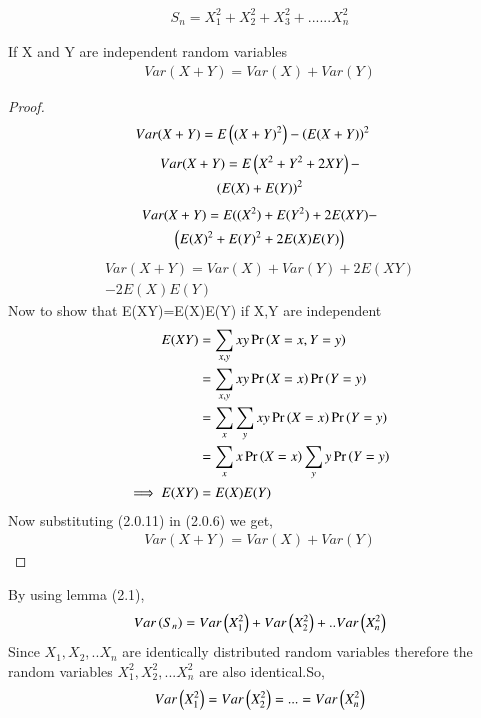 \documentclass[journal,12pt,twocolumn]{IEEEtran}
\begin{document}
\begin{align}
    S_{n}=X_{1}^2+X_{2}^2+X_{3}^2+......X_{n}^2
\end{align}
 \begin{lemma}
 If X and Y are independent random variables
 \begin{align}
     Var(X+Y)=Var(X)+Var(Y)
 \end{align}
 \end{lemma}
 \begin{proof}
 \begin{align}
    Var(X+Y)&=E\left((X+Y)^{2}\right)-\left(E(X+Y)\right)^{2}
 \end{align}
 \begin{multline}
Var(X+Y)=E\left(X^{2}+Y^{2}+2XY\right)-\\
 \left(E(X)+E(Y)\right)^{2}
\end{multline}
\begin{multline}
Var(X+Y)=E((X^{2})+E(Y^{2})+2E(XY)-\\
        \left(E(X)^{2}+E(Y)^{2}+2E(X)E(Y)\right)
\end{multline}      
\begin{multline}
    Var(X+Y)=Var(X)+Var(Y)+2E(XY)\\
    -2E(X)E(Y)
\end{multline}
 Now to show that E(XY)=E(X)E(Y) if X,Y are independent
 \begin{align}
     E(XY)&=\sum_{x,y}xy\Pr\left(X=x,Y=y\right)
     \\ &=\sum_{x,y}xy\Pr\left(X=x\right)\Pr\left(Y=y\right)
     \\ &=\sum_{x}\sum_{y}xy\Pr\left(X=x\right)\Pr\left(Y=y\right)
     \\ &=\sum_{x}x\Pr\left(X=x\right)\sum_{y}y\Pr\left(Y=y\right)
     \\\implies E(XY) &=E(X)E(Y)
 \end{align}
 Now substituting (2.0.11) in (2.0.6) we get,
 \begin{align}
     Var(X+Y)=Var(X)+Var(Y)
 \end{align}
 \end{proof}
By using lemma (2.1),
\begin{align}
    Var\left(S_{n}\right)=Var\left(X_{1}^2\right)+Var\left(X_{2}^2\right)+..Var\left(X_{n}^2\right)
\end{align}
Since $X_{1},X_{2},..X_{n}$ are identically distributed random variables therefore the random variables $X_{1}^2,X_{2}^2,...X_{n}^2$ are also identical.So,
\begin{align}
    Var\left(X_{1}^2\right)=Var\left(X_{2}^2\right)=...=Var\left(X_{n}^2\right)
\end{align}
\end{document}
